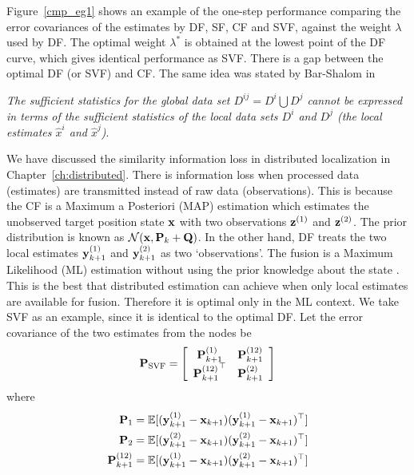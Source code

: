 Figure~\ref{cmp_eg1} shows an example of the one-step performance comparing the error covariances of the estimates by DF, SF, CF and SVF, against the weight $\lambda$ used by DF. The optimal weight $\lambda^*$ is obtained at the lowest point of the DF curve, which gives identical performance as SVF. There is a gap between the optimal DF (or SVF) and CF. The same idea was stated by Bar-Shalom in \cite{ShalomComments}
\begin{displayquote}
\textit{The sufficient statistics for the global data set $D^{ij}=D^i\bigcup D^j$ cannot be expressed in terms of the sufficient statistics of the local data sets $D^i$ and $D^j$ (the local estimates $\hat{x}^i$ and $\hat{x}^j$)}.
\end{displayquote}
We have discussed the similarity information loss in distributed localization in Chapter~\ref{ch:distributed}. There is information loss when processed data (estimates) are transmitted instead of raw data (observations). This is because the CF is a Maximum a Posteriori (MAP) estimation which estimates the unobserved target position state $\bf x$ with two observations ${\bf z}^{(1)}$ and ${\bf z}^{(2)}$. The prior distribution is known as $\mathcal{N}({\bf x},{\bf P}_k+{\bf Q})$. In the other hand, DF treats the two local estimates ${\bf y}^{(1)}_{k+1}$ and ${\bf y}^{(2)}_{k+1}$ as two `observations'. The fusion is a Maximum Likelihood (ML) estimation without using the prior knowledge about the state \cite{Chang1997}. This is the best that distributed estimation can achieve when only local estimates are available for fusion. Therefore it is optimal only in the ML context. We take SVF as an example, since it is identical to the optimal DF. Let the error covariance of the two estimates from the nodes be
\begin{equation}
{\bf P}_{\text{SVF}}=\left[
                       \begin{array}{cc}
                         {\bf P}^{(1)}_{k+1} & {\bf P}^{(12)}_{k+1} \\
                         {{\bf P}^{(12)}_{k+1}}^\top & {\bf P}^{(2)}_{k+1} \\
                       \end{array}
                     \right]
\end{equation}
where
\begin{equation}
\begin{split}
{\bf P}_{1}&=\mathbb{E}[({{\bf y}^{(1)}_{k+1}}-{\bf x}_{k+1})({{\bf y}^{(1)}_{k+1}}-{\bf x}_{k+1})^\top]\\
{\bf P}_{2}&=\mathbb{E}[({{\bf y}^{(2)}_{k+1}}-{\bf x}_{k+1})({{\bf y}^{(2)}_{k+1}}-{\bf x}_{k+1})^\top]\\
{\bf P}^{(12)}_{k+1}&=\mathbb{E}[({{\bf y}^{(1)}_{k+1}}-{\bf x}_{k+1})({{\bf y}^{(2)}_{k+1}}-{\bf x}_{k+1})^\top]\\
\end{split}
\end{equation}
